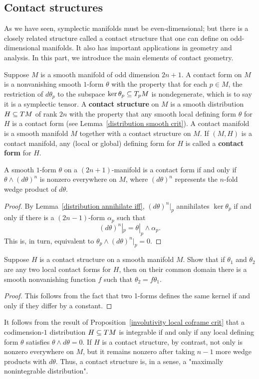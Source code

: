 \subsection{Contact structures}
As we have seen, symplectic manifolds must be even-dimensional; but there is a closely related structure called a contact structure that one can define on odd-dimensional manifolds. It also has important applications in geometry and analysis. In this part, we introduce the main elements of contact geometry.\par
Suppose $M$ is a smooth manifold of odd dimension $2n+1$. A contact form on $M$ is a nonvanishing smooth $1$-form $\theta$ with the property that for each $p\in M$, the restriction of $d\theta_p$ to the subspace $\ker\theta_p\subseteq T_pM$ is nondegenerate, which is to say it is a symplectic tensor. A \textbf{contact structure} on $M$ is a smooth distribution $H\subseteq TM$ of rank $2n$ with the property that any smooth local defining form $\theta$ for $H$ is a contact form (see Lemma~\ref{distribution smooth crit}). A contact manifold is a smooth manifold $M$ together with a contact structure on $M$. If $(M,H)$ is a contact manifold, any (local or global) defining form for $H$ is called a \textbf{contact form} for $H$.
\begin{proposition}
A smooth $1$-form $\theta$ on a $(2n+1)$-manifold is a contact form if and only if $\theta\wedge (d\theta)^n$ is nonzero everywhere on $M$, where $(d\theta)^n$ represents the $n$-fold wedge product of $d\theta$.
\end{proposition}
\begin{proof}
By Lemma~\ref{distribution annihilate iff}, $(d\theta)^n|_p$ annihilates $\ker\theta_p$ if and only if there is a $(2n-1)$-form $\alpha_p$ such that
\[(d\theta)^n|_p=\theta|_p\wedge\alpha_p.\]
This is, in turn, equivalent to $\theta_p\wedge(d\theta)^n|_p=0$.
\end{proof}
\begin{proposition}
Suppose $H$ is a contact structure on a smooth manifold $M$. Show that if $\theta_1$ and $\theta_2$ are any two local contact forms for $H$, then on their common domain there is a smooth nonvanishing function $f$ such that $\theta_2=f\theta_1$.
\end{proposition}
\begin{proof}
This follows from the fact that two 1-forms defines the same kernel if and only if they differ by a constant.
\end{proof}
It follows from the result of Proposition~\ref{involutivity local coframe crit} that a codimension-$1$ distribution $H\subseteq TM$ is integrable if and only if any local defining form $\theta$ satisfies $\theta\wedge d\theta=0$. If $H$ is a contact structure, by contrast, not only is  nonzero everywhere on $M$, but it remains nonzero after taking $n-1$ more wedge products with $d\theta$. Thus, a contact structure is, in a sense, a "maximally nonintegrable distribution".
